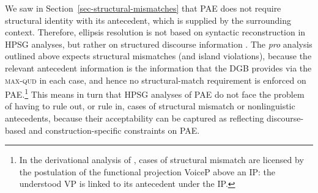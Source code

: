 {We saw in Section~\ref{sec-structural-mismatches} that PAE does not require structural identity with its antecedent, which is supplied by the surrounding context. Therefore, ellipsis resolution is not based on syntactic reconstruction in HPSG analyses, but rather on structured discourse information \citep[see][295]{Ginzburg:Sag:2000}. %
%
The \emph{pro} analysis outlined above expects structural mismatches (and island violations), %
%
because the relevant antecedent information is the information that the DGB provides via the \textsc{max-qud} in each case, and hence no structural-match requirement is enforced on PAE.\footnote{In the derivational
analysis of \citet{Merchant2013}, cases of structural mismatch are licensed by
the postulation of the functional projection VoiceP above an IP: the understood
VP is linked to its antecedent under the IP.} This means in turn that HPSG analyses of PAE do not face the problem of having to rule out, or rule in, cases of structural mismatch or nonlinguistic antecedents, because their acceptability can be captured as reflecting discourse-based and construction-specific constraints on PAE.



}
